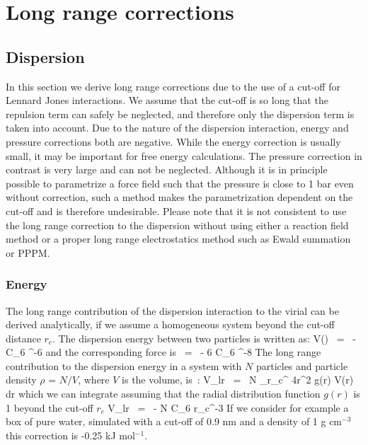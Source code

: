 \newcommand{\dr}{{\rm d}r}
\newcommand{\avcsix}{\left< C_6 \right>}
\chapter{Long range corrections}
\label{ch:lrcorr}
\section{Dispersion}
In this section we derive long range corrections due to the use of
a cut-off for Lennard Jones interactions. 
We assume that the cut-off is so long that the repulsion term
can safely be neglected, and therefore only the dispersion term is
taken into account. Due to the nature of the dispersion interaction,
energy and pressure corrections both are negative. While
the energy correction is usually small, it may be important for
free energy calculations. The pressure correction in contrast is 
very large and can not be neglected. Although it is in principle
possible to parametrize a force field such that the pressure is
close to 1 bar even without correction, such a method makes the
parametrization dependent on the cut-off and is therefore
undesirable. Please note that it is not consistent to use the long range
correction to the dispersion without using either a reaction field
method or a proper long range electrostatics method such as Ewald
summation or PPPM.

\subsection{Energy}
\label{sec:ecorr}
The long range contribution of the dispersion interaction to the
virial can be derived analytically, if we assume a homogeneous
system beyond the cut-off distance $r_c$. The dispersion energy
between two particles is written as:
\beq
V(\rij)	~=~	- C_6 \rij^{-6}
\eeq
and the corresponding force is
\beq
\Fvij	~=~	- 6 C_6 \rij^{-8}\rvij
\eeq
The long range contribution to the dispersion energy
in a system with $N$ particles and particle density
$\rho$ = $N/V$, where $V$ is the volume, is~\cite{Allen87}:
\beq
V_{lr}  ~=~ \half N \rho\int_{r_c}^{\infty}   4\pi r^2 g(r) V(r) {\dr}
\eeq
which we can integrate assuming that the radial distribution function $g(r)$ 
is 1 beyond the cut-off $r_c$
\beq
V_{lr}	~=~ - N \rho\pi C_6 r_c^{-3}
\eeq
If we consider for example a box of pure water, simulated with a cut-off
of 0.9 nm and a density of 1 g cm$^{-3}$ this correction is 
-0.25 kJ mol$^{-1}$.

